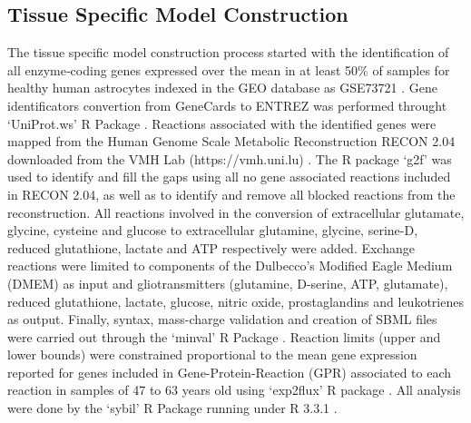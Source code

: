 \subsection{Tissue Specific Model Construction}
The tissue specific model construction process started with the identification of all enzyme‐coding genes expressed over the mean in at least 50\% of samples for healthy human astrocytes indexed in the GEO database \cite{Edgar2002} as GSE73721 \citep{Zhang2016}. Gene identificators convertion from GeneCards\cite{rebhan1997genecards} to ENTREZ \cite{maglott2005entrez} was performed throught `UniProt.ws' R Package \cite{Carlson2016}. Reactions associated with the identified genes were mapped from the Human Genome Scale  Metabolic Reconstruction RECON 2.04 downloaded from the VMH Lab (https://vmh.uni.lu) \cite{thiele2013community}. The R package `g2f' \cite{G2F} was used to identify and fill the gaps using all no gene associated reactions included in RECON 2.04, as well as to identify and remove all blocked reactions  from the reconstruction. All reactions involved in the conversion of extracellular glutamate, glycine, cysteine and glucose to extracellular glutamine, glycine, serine-D, reduced glutathione, lactate and ATP respectively were added. Exchange reactions were limited to components of the Dulbecco's Modified Eagle Medium (DMEM) as input and gliotransmitters (glutamine, D-serine, ATP, glutamate), reduced glutathione, lactate, glucose, nitric oxide, prostaglandins and leukotrienes as output. Finally, syntax, mass-charge validation and creation of SBML files were carried out through the `minval' R Package \cite{MINVAL}. Reaction limits (upper and lower bounds) were constrained proportional to the mean gene expression reported for genes included in Gene-Protein-Reaction (GPR) \cite{Thiele2010} associated to each reaction in samples of 47 to 63 years old using `exp2flux' R package \cite{EXP2FLUX}. All analysis were done by the `sybil' \cite{Gelius-Dietrich2013} R Package running under R 3.3.1 \cite{RCoreTeam2016}.
